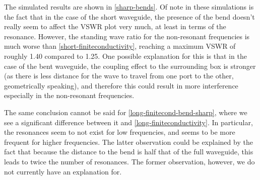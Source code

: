 The simulated results are shown in \cref{sharp-bends}. Of note in these simulations is the fact that in the
case of the short waveguide, the presence of the bend doesn't really seem to affect the VSWR plot very much,
at least in terms of the resonance. However, the standing wave ratio for the non-resonant frequencies is much
worse than \cref{short-finiteconductivity}, reaching a maximum VSWR of roughly 1.40 compared to 1.25. One
possible explanation for this is that in the case of the bent waveguide, the coupling effect to the
surrounding box is stronger (as there is less distance for the wave to travel from one port to the other,
geometrically speaking), and therefore this could result in more interference especially in the non-resonant
frequencies. 

The same conclusion cannot be said for \cref{long-finitecond-bend-sharp}, where we see a significant difference
between it and \cref{long-finiteconductivity}. In particular, the resonances seem to not exist for low
frequencies, and seems to be more frequent for higher frequencies. The latter observation could be explained
by the fact that because the distance to the bend is half that of the full waveguide, this leads to twice the
number of resonances. The former observation, however, we do not currently have an explanation for.   


